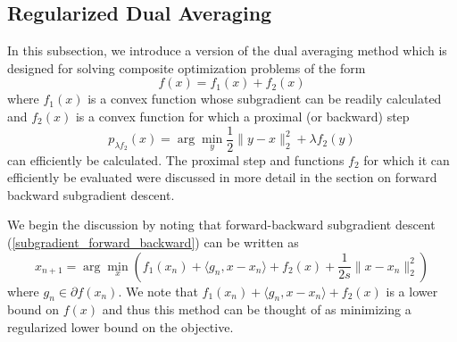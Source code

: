 \subsection{Regularized Dual Averaging}

In this subsection, we introduce a version of the dual averaging method which is designed for solving composite
optimization problems of the form
\begin{equation}
 f(x) = f_1(x) + f_2(x)
\end{equation}
where $f_1(x)$ is a convex function whose subgradient can be readily calculated and $f_2(x)$ is a convex function
for which a proximal (or backward) step
\begin{equation}
 p_{\lambda f_2}(x) = \arg\min_y \frac{1}{2}\|y - x\|_2^2 + \lambda f_2(y)
\end{equation}
can efficiently be calculated. The proximal step and functions $f_2$ for which it can efficiently be evaluated were
discussed in more detail in the section on forward backward subgradient descent.

We begin the discussion by noting that forward-backward subgradient descent (\ref{subgradient_forward_backward}) can be written
as
\begin{equation}
 x_{n+1} = \arg\min_x \left(f_1(x_n) + \langle g_n, x - x_n\rangle + f_2(x) + \frac{1}{2s}\|x - x_n\|_2^2\right)
\end{equation}
where $g_n\in \partial f(x_n)$. We note that $f_1(x_n) + \langle g_n, x - x_n\rangle + f_2(x)$ is a lower bound on
$f(x)$ and thus this method can be thought of as minimizing a regularized lower bound on the objective.

